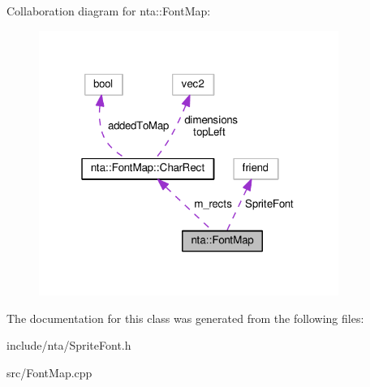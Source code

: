 Collaboration diagram for nta\+:\+:Font\+Map\+:\nopagebreak
\begin{figure}[H]
\begin{center}
\leavevmode
\includegraphics[width=277pt]{d3/d2b/classnta_1_1FontMap__coll__graph}
\end{center}
\end{figure}


The documentation for this class was generated from the following files\+:\begin{DoxyCompactItemize}
\item 
include/nta/Sprite\+Font.\+h\item 
src/Font\+Map.\+cpp\end{DoxyCompactItemize}
